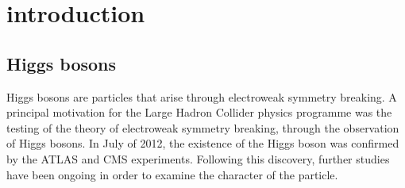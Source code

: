 \chapter{introduction}
\label{chapter:introduction}

\section{Higgs bosons}

Higgs bosons are particles that arise through electroweak symmetry breaking. A principal motivation for the Large Hadron Collider physics programme was the testing of the theory of electroweak symmetry breaking, through the observation of Higgs bosons. In July of 2012, the existence of the Higgs boson was confirmed by the ATLAS and CMS experiments. Following this discovery, further studies have been ongoing in order to examine the character of the particle.
